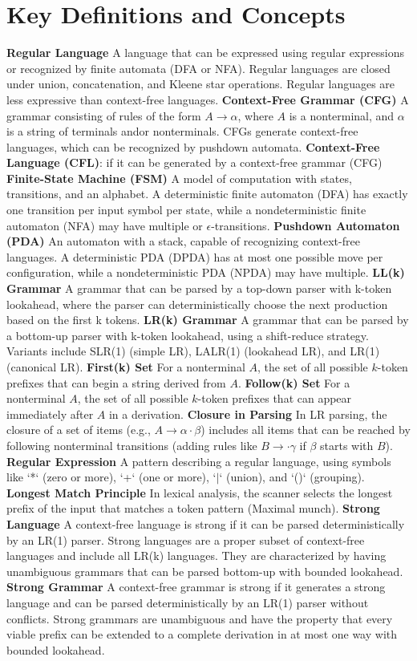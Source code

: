 
\section{Key Definitions and Concepts}
\textbf{Regular Language} A language that can be expressed using regular expressions or recognized by finite automata (DFA or NFA). Regular languages are closed under union, concatenation, and Kleene star operations.  Regular languages are less expressive than context-free languages.
\textbf{Context-Free Grammar (CFG)} A grammar consisting of rules of the form $A \rightarrow \alpha $, where $A$ is a nonterminal, and $\alpha $ is a string of terminals and\/or nonterminals. CFGs generate context-free languages, which can be recognized by pushdown automata.
\textbf{Context-Free Language (CFL)}: if it can be generated by a context-free grammar (CFG)
\textbf{Finite-State Machine (FSM)} A model of computation with states, transitions, and an alphabet. A deterministic finite automaton (DFA) has exactly one transition per input symbol per state, while a nondeterministic finite automaton (NFA) may have multiple or $\epsilon$-transitions.
\textbf{Pushdown Automaton (PDA)} An automaton with a stack, capable of recognizing context-free languages. A deterministic PDA (DPDA) has at most one possible move per configuration, while a nondeterministic PDA (NPDA) may have multiple.
\textbf{LL(k) Grammar} A grammar that can be parsed by a top-down parser with k-token lookahead, where the parser can deterministically choose the next production based on the first k tokens.
\textbf{LR(k) Grammar} A grammar that can be parsed by a bottom-up parser with k-token lookahead, using a shift-reduce strategy. Variants include SLR(1) (simple LR), LALR(1) (lookahead LR), and LR(1) (canonical LR).
\textbf{First(k) Set} For a nonterminal $A$, the set of all possible $k$-token prefixes that can begin a string derived from $A$.
\textbf{Follow(k) Set} For a nonterminal $A$, the set of all possible $k$-token prefixes that can appear immediately after $A$ in a derivation.
\textbf{Closure in Parsing} In LR parsing, the closure of a set of items (e.g., $A \rightarrow \alpha \cdot \beta $) includes all items that can be reached by following nonterminal transitions (adding rules like $B \rightarrow \cdot \gamma$ if $\beta $ starts with $B$).
\textbf{Regular Expression} A pattern describing a regular language, using symbols like `*` (zero or more), `+` (one or more), `$\vert$` (union), and `()` (grouping).
\textbf{Longest Match Principle} In lexical analysis, the scanner selects the longest prefix of the input that matches a token pattern (Maximal munch).
\textbf{Strong Language} A context-free language is strong if it can be parsed deterministically by an LR(1) parser. Strong languages are a proper subset of context-free languages and include all LR(k) languages. They are characterized by having unambiguous grammars that can be parsed bottom-up with bounded lookahead.
\textbf{Strong Grammar} A context-free grammar is strong if it generates a strong language and can be parsed deterministically by an LR(1) parser without conflicts. Strong grammars are unambiguous and have the property that every viable prefix can be extended to a complete derivation in at most one way with bounded lookahead.
